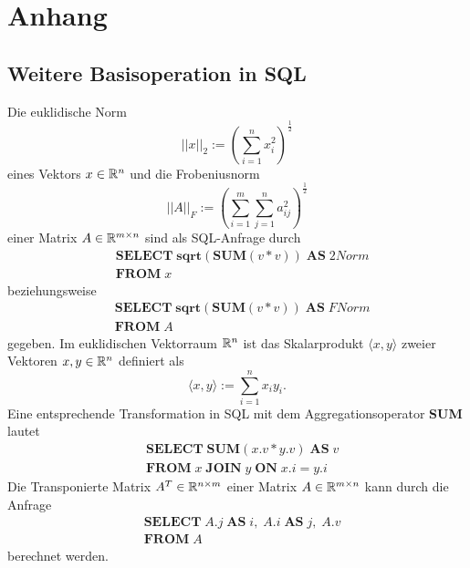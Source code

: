 \chapter{Anhang}

\section{Weitere Basisoperation in SQL}
\label{app:app_1}
Die euklidische Norm 
\begin{equation*}
    ||x||_{2}:=\left(\sum_{i=1}^n x_i^2\right)^{\frac{1}{2}}
\end{equation*}
eines Vektors $x \in \mathbb{R}^n$ und die Frobeniusnorm 
\begin{equation*}
    ||A||_F:=\left(\sum_{i=1}^m \sum_{j=1}^n a_{ij}^2\right)^{\frac{1}{2}} 
\end{equation*}
einer Matrix $A \in \mathbb{R}^{m \times n}$ sind als SQL-Anfrage durch
\begin{align*}
    & \mathbf{SELECT} \; \mathbf{sqrt}(\mathbf{SUM}(v*v)) \; \mathbf{AS} \; 2Norm \\
    & \mathbf{FROM} \; x
\end{align*}
beziehungsweise
\begin{align*}
    & \mathbf{SELECT} \; \mathbf{sqrt}(\mathbf{SUM}(v*v)) \; \mathbf{AS} \; FNorm \\
    & \mathbf{FROM} \; A
\end{align*}
gegeben.
Im euklidischen Vektorraum $\mathbb{R}^n$ ist das Skalarprodukt $\langle x,y \rangle$ zweier Vektoren $x,y \in \mathbb{R}^n$ definiert als 
\begin{equation*}
    \langle x,y \rangle :=\sum_{i=1}^n x_i y_i.
\end{equation*}
Eine entsprechende Transformation in SQL mit dem Aggregationsoperator \textbf{SUM} lautet
\begin{align*}
    & \mathbf{SELECT} \; \mathbf{SUM}(x.v*y.v) \; \mathbf{AS} \; v \\
    & \mathbf{FROM} \; x \; \mathbf{JOIN} \; y \; \mathbf{ON} \; x.i=y.i
\end{align*}
Die Transponierte Matrix $A^T \in \mathbb{R}^{n \times m}$ einer Matrix $A \in \mathbb{R}^{m \times n}$ kann durch die Anfrage 
\begin{align*}
    & \mathbf{SELECT} \; A.j \; \mathbf{AS} \; i, \; A.i \; \mathbf{AS} \; j, \; A.v\\
    & \mathbf{FROM} \; A
\end{align*}
berechnet werden.

